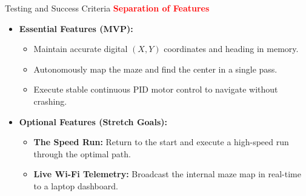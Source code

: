 \documentclass{beamer}
\begin{document}
\begin{frame}{Testing and Success Criteria}
  \transfade[duration=0.1]
  \textcolor{red}{\textbf{\large Separation of Features}}
  \vspace{0.5em}
  \begin{itemize}[<+->]
    \item \textbf{Essential Features (MVP):}
      \begin{itemize}[<+->]
        \item Maintain accurate digital $(X, Y)$ coordinates and heading in memory.
        \item Autonomously map the maze and find the center in a single pass.
        \item Execute stable continuous PID motor control to navigate without crashing.
      \end{itemize}
    \item \textbf{Optional Features (Stretch Goals):}
      \begin{itemize}[<+->]
        \item \textbf{The Speed Run:} Return to the start and execute a high-speed run through the optimal path.
        \item \textbf{Live Wi-Fi Telemetry:} Broadcast the internal maze map in real-time to a laptop dashboard.
      \end{itemize}
  \end{itemize}
\end{frame}
\end{document}
